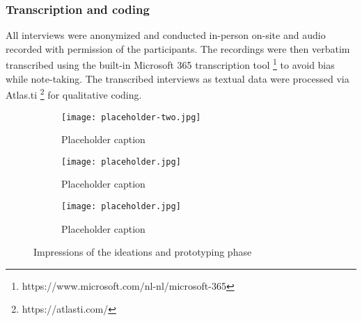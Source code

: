 \subsubsection{Transcription and coding}
All interviews were anonymized and conducted in-person on-site and audio recorded with permission of the participants. The recordings were then verbatim transcribed using the built-in Microsoft 365 transcription tool \footnote{https://www.microsoft.com/nl-nl/microsoft-365} to avoid bias while note-taking. The transcribed interviews as textual data were processed via Atlas.ti \footnote{https://atlasti.com/} for qualitative coding.

\begin{figure*}[b]
    \centering
        \begin{subfigure}[b]{0.5\textwidth}
        \texttt{[image: placeholder-two.jpg]}
        \caption{Placeholder caption}
        \label{fig:3_4_combined}
    \end{subfigure}
    \begin{subfigure}[b]{0.23\textwidth}
        \texttt{[image: placeholder.jpg]}
        \caption{Placeholder caption}
        \label{fig:1}
    \end{subfigure}
    \hfill
    \begin{subfigure}[b]{0.23\textwidth}
        \texttt{[image: placeholder.jpg]}
        \caption{Placeholder caption}
        \label{fig:2}
    \end{subfigure}
    \hfill
    \caption{Impressions of the ideations and prototyping phase}
    \label{fig:full_width}
\end{figure*}